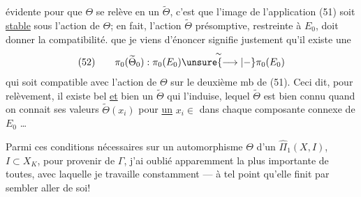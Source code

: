 évidente pour que $\Theta$ se relève en un $\widetilde{\Theta}$, c'est que l'image de l'application (51) soit \uline{stable} sous l'action de $\Theta$; en fait, l'action $\widetilde{\Theta}$ présomptive, restreinte à $E_0$, doit donner la compatibilité.     que je viens d'énoncer signifie justement qu'il existe une  
\[
(52)\qquad \pi_0(\widetilde{\Theta}_0):\pi_0(E_0)\overset{\sim}{\unsure{\longrightarrow|\mathbin{-}}}\pi_0(E_0)
\]
 qui soit compatible avec l'action de $\Theta$ sur le deuxième mb de (51). Ceci dit, pour  relèvement, il existe bel  \uline{et} bien un $\widetilde{\Theta}$ qui l'induise,  lequel $\widetilde{\Theta}$ est bien connu quand on connait ses valeurs $\widetilde{\Theta}(x_i)$  pour \uline{un} $x_i\in$   dans chaque composante connexe de $E_0$ \ldots

Parmi ces conditions nécessaires  sur un automorphisme $\Theta$ d'un $\widehat{\Pi}_1(X,I)$, $I\subset X_K$, pour provenir de $\Gamma$, j'ai oublié apparemment la plus importante de toutes, avec laquelle je travaille  constamment --- à tel point qu'elle finit par sembler aller de soi!
